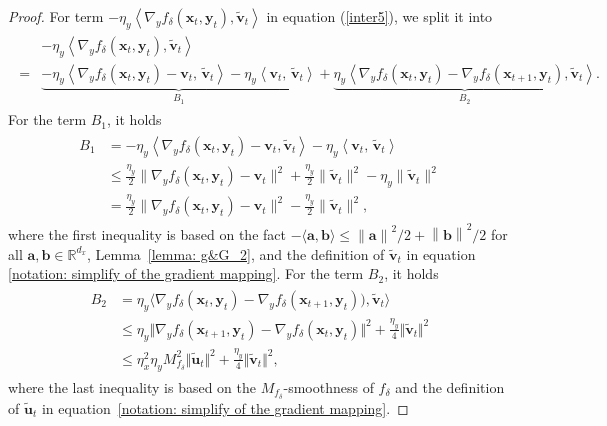 \documentclass[11pt]{article}
\def\va{\mathbf{a}}
\def\vb{\mathbf{b}}
\def\vu{\mathbf{u}}
\def\vv{\mathbf{v}}
\def\vx{\mathbf{x}}
\def\vy{\mathbf{y}}
\def\BR{{\mathbb{R}}}
\newcommand{\norm}[1]{\left\| #1 \right\|}
\begin{document}
\begin{proof}
For term $-\eta_y \left\langle \nabla_y f_{\delta}(  \vx_t, \mathbf{y}_t ),  \tilde{\vv}_t  \right\rangle$ in equation (\ref{inter5}), we split it into
\begin{align}\label{inter7}
\begin{split}
&-\eta_y \left\langle \nabla_y f_{\delta}(  \vx_t, \mathbf{y}_t ),  \tilde{\vv}_t  \right\rangle\\
=&
\underbrace{-\eta_y \left\langle \nabla_y f_{\delta}(  \vx_t, \mathbf{y}_t )- \mathbf{v}_t ,\,   \tilde{\vv}_t  \right\rangle
-\eta_y \left\langle \mathbf{v}_t,\,  \tilde{\vv}_t  \right\rangle}_{B_1}
+   \underbrace{\eta_y \left\langle \nabla_y f_{\delta}(  \vx_t, \mathbf{y}_t )- \nabla_y f_{\delta}(  \vx_{t+1},\mathbf{y}_t ),
 \tilde{\vv}_t \right\rangle}_{B_2}.
 \end{split}
\end{align}
For the term $B_1$, it holds
\begin{align}\label{inter8}
\begin{split}
B_1 & = -\eta_y \left\langle \nabla_y f_{\delta}(  \vx_t, \mathbf{y}_t )- \mathbf{v}_t ,  \tilde{\vv}_t  \right\rangle
-\eta_y \left\langle \mathbf{v}_t,\,  \tilde{\vv}_t  \right\rangle\\
& \le \frac{\eta_y}{2}\|\nabla_y f_{\delta}(  \vx_t, \mathbf{y}_t )- \mathbf{v}_t\|^2+
\frac{\eta_y}{2}\|\tilde{\vv}_t\|^2 -\eta_y\|\tilde{\vv}_t\|^2\\
& = \frac{\eta_y}{2}\|\nabla_y f_{\delta}(  \vx_t, \mathbf{y}_t )- \mathbf{v}_t\|^2-
\frac{\eta_y}{2}\|\tilde{\vv}_t\|^2, 
\end{split}
\end{align}
where the first inequality is based on the fact $ -\langle \va,\vb\rangle \leq \norm{\va}^2/2 + \norm{\vb}^2/2$ for all $\va,\vb\in\BR^{d_x}$, Lemma~\ref{lemma: g&G_2}, and the definition of $\tilde{\vv}_t$ in equation \eqref{notation: simplify of the gradient mapping}.
For the term $B_2$, it holds
\begin{align}\label{inter9}
\begin{split}
 B_2 & =  \eta_y\langle\nabla_y f_{\delta}( \vx_t,  \vy_t )- \nabla_y f_{\delta}( \vx_{t+1}, \vy_t )),  \tilde{\vv}_t\rangle\\
 & \le 
   \eta_y \Vert \nabla_y f_{\delta}( \vx_{t+1},  \vy_t ) - \nabla_y f_{\delta}( \vx_t, \vy_t ) \Vert^2 +  \frac{\eta_y}{4} \Vert  \tilde{\vv}_t  \Vert^2 \\
& \le    \eta_x^2 \eta_y M_{f_\delta}^2 \Vert  \tilde{\vu}_t \Vert^2 +  \frac{\eta_y}{4} \Vert \tilde{\vv}_t  \Vert^2,
\end{split}
\end{align}
where the last inequality is based on the $M_{f_\delta}$-smoothness of $f_\delta$ and the definition of $\tilde{\vu}_t$ in equation~\eqref{notation: simplify of the gradient mapping}.


\end{proof}
\end{document}
